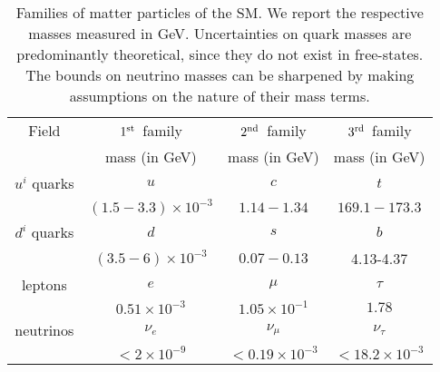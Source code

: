 \documentclass[12pt,a4paper]{book}
\begin{document}
\begin{small}
\renewcommand{\arraystretch}{1.6}
\begin{table}[h!]
\begin{center}
\begin{tabular}{cccc}
\hline
Field & $1^{\rm st}\,$ family & $2^{\rm nd}\,$ family & $3^{\rm rd}\,$ family \\
 & mass (in GeV) & mass (in GeV) & mass (in GeV) \\
\hline
$u^i$ quarks & $u$ & $c$ & $t$ \\
 & $(1.5 - 3.3) \times 10^{-3}$ & $1.14-1.34$ & $169.1-173.3$\\
\hline
$d^i$ quarks & $d$ & $s$ & $b$ \\
 & $(3.5-6) \times 10^{-3}$ & $0.07-0.13$ & 4.13-4.37 \\
\hline
leptons & $e$ & $\mu$ & $\tau$ \\
 & $0.51 \times 10^{-3}$ & $1.05 \times 10^{-1}$ & $1.78$\\
\hline
neutrinos & $\nu_e$ & $\nu_\mu$ & $\nu_\tau$ \\
 & $< 2 \times 10^{-9}$ & $< 0.19 \times 10^{-3}$ & $< 18.2 \times 10^{-3}$\\
\hline
\end{tabular}
\end{center}
\caption{Families of matter particles of the SM. We report the respective masses measured in GeV. Uncertainties on quark masses are predominantly theoretical, since they do not exist in free-states. The bounds on neutrino masses can be sharpened by making assumptions on the nature of their mass terms.}
\label{tab:SMFamilies}
\end{table}
\end{small}
\end{document}
